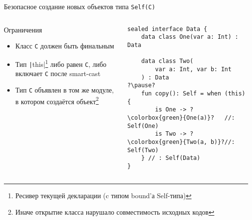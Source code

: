 \documentclass[handout,aspectratio=169,usenames,dvipsnames]{beamer}
\begin{document}
    \begin{frame}[fragile]{Безопасное создание новых объектов типа \texttt{Self(C)}}
        \begin{columns}[onlytextwidth]
            \begin{column}[t]{0.46\textwidth}
                \begin{block}{Ограничения}
                    \begin{itemize}
                        \item Класс \texttt{C} должен быть финальным
                        \item Тип \texttt|this|\footnote{Ресивер текущей декларации (c типом bound'а Self-типа)} либо равен \texttt{С}, либо включает \texttt{C} после smart-cast
                        \item Тип \texttt{C} объявлен в том же модуле, в котором создаётся объект\footnote{Иначе открытие класса нарушало совместимость исходных кодов}
                    \end{itemize}
                \end{block}
            \end{column}\hfill%
            \begin{column}[t]{0.50\textwidth}
                \pause
                \begin{verbatim}
sealed interface Data {
    data class One(var a: Int) : Data

    data class Two(
        var a: Int, var b: Int
    ) : Data
?\pause?
    fun copy(): Self = when (this) {
        is One -> ?\colorbox{green}{One(a)}?   //: Self(One)
        is Two -> ?\colorbox{green}{Two(a, b)}?//: Self(Two)
    } // : Self(Data)
}
                \end{verbatim}
            \end{column}
        \end{columns}
    \end{frame}
\end{document}
